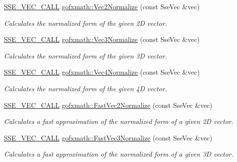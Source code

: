 \begin{DoxyCompactItemize}
\hyperlink{ssevec__math__defs_8h_a97454f977a5281455cecacce1e8ba670}{S\+S\+E\+\_\+\+V\+E\+C\+\_\+\+C\+A\+L\+L} \hyperlink{group___s_i_m_d_vec_math_ga2924184aeecf58733cf8cd36e025b0a6}{gofxmath\+::\+Vec2\+Normalize} (const Sse\+Vec \&vec)
\begin{DoxyCompactList}\small\item\em Calculates the normalized form of the given 2\+D vector. \end{DoxyCompactList}\item 
\hyperlink{ssevec__math__defs_8h_a97454f977a5281455cecacce1e8ba670}{S\+S\+E\+\_\+\+V\+E\+C\+\_\+\+C\+A\+L\+L} \hyperlink{group___s_i_m_d_vec_math_ga652e2847e6f220ff53c1e99ffe14c68c}{gofxmath\+::\+Vec3\+Normalize} (const Sse\+Vec \&vec)
\begin{DoxyCompactList}\small\item\em Calculates the normalized form of the given 3\+D vector. \end{DoxyCompactList}\item 
\hyperlink{ssevec__math__defs_8h_a97454f977a5281455cecacce1e8ba670}{S\+S\+E\+\_\+\+V\+E\+C\+\_\+\+C\+A\+L\+L} \hyperlink{group___s_i_m_d_vec_math_ga426569dc94583afda5006317993642df}{gofxmath\+::\+Vec4\+Normalize} (const Sse\+Vec \&vec)
\begin{DoxyCompactList}\small\item\em Calculates the normalized form of the given 4\+D vector. \end{DoxyCompactList}\item 
\hyperlink{ssevec__math__defs_8h_a97454f977a5281455cecacce1e8ba670}{S\+S\+E\+\_\+\+V\+E\+C\+\_\+\+C\+A\+L\+L} \hyperlink{group___s_i_m_d_vec_math_gaebbcf811d495f5e61c17624041e7c6d4}{gofxmath\+::\+Fast\+Vec2\+Normalize} (const Sse\+Vec \&vec)
\begin{DoxyCompactList}\small\item\em Calculates a fast approximation of the normalized form of a given 2\+D vector. \end{DoxyCompactList}\item 
\hyperlink{ssevec__math__defs_8h_a97454f977a5281455cecacce1e8ba670}{S\+S\+E\+\_\+\+V\+E\+C\+\_\+\+C\+A\+L\+L} \hyperlink{group___s_i_m_d_vec_math_gab94457a45f418afc149535de9bc04ba1}{gofxmath\+::\+Fast\+Vec3\+Normalize} (const Sse\+Vec \&vec)
\begin{DoxyCompactList}\small\item\em Calculates a fast approximation of the normalized form of a given 3\+D vector. \end{DoxyCompactList}\item 

\end{DoxyCompactItemize}
